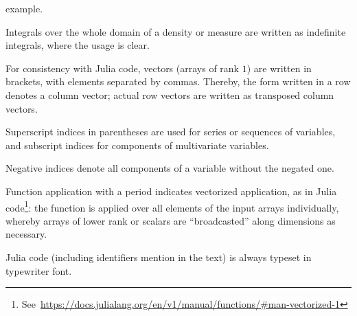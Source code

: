 \begin{symbolicfootnotes}
\begin{description}[style=nextline, leftmargin=4cm]
    example.
  \item[\(\int \prob{x} \dif x = 1\)] Integrals over the whole domain of a density or measure are
    written as indefinite integrals, where the usage is clear.
  \item[{\([x, y, z] = \smash[b]{\begin{bsmallmatrix}x\\y\\z\end{bsmallmatrix}}\)}] For consistency
    with Julia code, vectors (arrays of rank \(1\)) are written in brackets, with elements separated
    by commas.  Thereby, the form written in a row denotes a column vector; actual row vectors are
    written as transposed column vectors.
  \item[{\(\kth{\Theta} = [\kth{\Theta}_1, \ldots, \kth{\Theta}_N]\)}] Superscript indices in
    parentheses are used for series or sequences of variables, and subscript indices for components of
    multivariate variables.
  \item[{\(z_{-i} = [z_{1}, \ldots, z_{i-1}, z_{i+1}, \ldots, z_{N}]\)}] Negative indices denote all
    components of a variable without the negated one.
  \item[{\(\broadcast{f}(x, 1) = [f(x_{1}, 1), \ldots, f(x_{N}, 1)]\)}] Function application with a
    period indicates vectorized application, as in Julia
    code\footnote{See~\protect\url{https://docs.julialang.org/en/v1/manual/functions/\#man-vectorized-1}}:
    the function is applied over all elements of the input arrays individually, whereby arrays of
    lower rank or scalars are \enquote{broadcasted} along dimensions as necessary.
  \item[{\jlinlfont f(x) = rand(x)}] Julia code (including identifiers mention in the text) is always typeset in
    typewriter font.
  \end{description}
\end{symbolicfootnotes}

